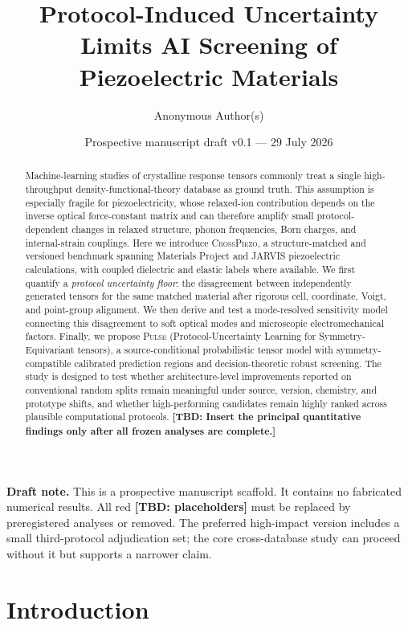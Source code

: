 \documentclass[11pt]{article}
\title{\textbf{Protocol-Induced Uncertainty Limits AI Screening of Piezoelectric Materials}}
\author[1]{Anonymous Author(s)}
\affil[1]{Anonymous Institution}
\date{Prospective manuscript draft v0.1 --- 29 July 2026}
\newcommand{\TBD}[1]{\textcolor{red!75!black}{\textbf{[TBD: #1]}}}
\newcommand{\draftnote}[1]{\par\noindent\colorbox{yellow!25}{\parbox{0.96\linewidth}{\textbf{Draft note.} #1}}\par}
\newcommand{\PULSE}{\textsc{Pulse}}
\newcommand{\CrossPiezo}{\textsc{CrossPiezo}}
\begin{document}
\maketitle

\draftnote{This is a prospective manuscript scaffold. It contains no fabricated numerical results. All red \TBD{placeholders} must be replaced by preregistered analyses or removed. The preferred high-impact version includes a small third-protocol adjudication set; the core cross-database study can proceed without it but supports a narrower claim.}

\begin{abstract}
Machine-learning studies of crystalline response tensors commonly treat a single high-throughput density-functional-theory database as ground truth. This assumption is especially fragile for piezoelectricity, whose relaxed-ion contribution depends on the inverse optical force-constant matrix and can therefore amplify small protocol-dependent changes in relaxed structure, phonon frequencies, Born charges, and internal-strain couplings. Here we introduce \CrossPiezo, a structure-matched and versioned benchmark spanning Materials Project and JARVIS piezoelectric calculations, with coupled dielectric and elastic labels where available. We first quantify a \emph{protocol uncertainty floor}: the disagreement between independently generated tensors for the same matched material after rigorous cell, coordinate, Voigt, and point-group alignment. We then derive and test a mode-resolved sensitivity model connecting this disagreement to soft optical modes and microscopic electromechanical factors. Finally, we propose \PULSE{} (Protocol-Uncertainty Learning for Symmetry-Equivariant tensors), a source-conditional probabilistic tensor model with symmetry-compatible calibrated prediction regions and decision-theoretic robust screening. The study is designed to test whether architecture-level improvements reported on conventional random splits remain meaningful under source, version, chemistry, and prototype shifts, and whether high-performing candidates remain highly ranked across plausible computational protocols. \TBD{Insert the principal quantitative findings only after all frozen analyses are complete.}
\end{abstract}

\section{Introduction}
\end{document}
